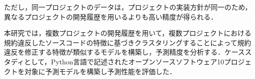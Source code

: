 \documentclass[T,J]{fose} %
\begin{document}
ただし，同一プロジェクトのデータは，プロジェクトの実装方針が同一のため，異なるプロジェクトの開発履歴を用いるよりも高い精度が得られる．

本研究では，複数プロジェクトの開発履歴を用いて，複数プロジェクトにおける規約違反したソースコードの特徴に基づきクラスタリングすることによって規約違反を修正する特徴が類似するモデルを構築し，予測精度を分析する．ケーススタディとして，Python言語で記述されたオープンソースソフトウェア10プロジェクトを対象に予測モデルを構築し予測性能を評価した．

\end{document}
